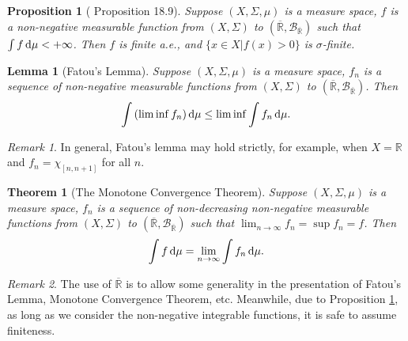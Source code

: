 \documentclass[openany]{book}
\newtheorem{lemma}{Lemma}[chapter]
\newtheorem{proposition}{Proposition}[chapter]
\newtheorem{theorem}{Theorem}[chapter]
\theoremstyle{definition}
\theoremstyle{remark}
\newtheorem*{remark}{Remark}
\begin{document}
\begin{proposition}[\cite{RF88} Proposition 18.9]\label{prop:inftyZeroMeasure}
    Suppose $(X,\Sigma,\mu)$ is a measure space, $f$ is a non-negative measurable function from $(X,\Sigma)$ to $(\overline{\mathbb{R}},\mathcal{B}_{\overline{\mathbb{R}}})$ such that $\int f \dif\mu<+\infty$. Then $f$ is finite a.e., and $\{x\in X|f(x)>0\}$ is $\sigma$-finite.
\end{proposition}
\begin{lemma}[Fatou's Lemma]
    Suppose $(X,\Sigma,\mu)$ is a measure space, $f_n$ is a sequence of non-negative measurable functions from $(X,\Sigma)$ to $(\overline{\mathbb{R}},\mathcal{B}_{\overline{\mathbb{R}}})$. Then
    \begin{equation*}
        \int\left(\lim\inf f_n\right)\dif\mu\le\lim\inf\int f_n \dif\mu.
    \end{equation*}
\end{lemma}
\begin{remark}
    In general, Fatou's lemma may hold strictly, for example, when $X=\mathbb{R}$ and $f_n=\chi_{[n,n+1]}$ for all $n$.
\end{remark}
\begin{theorem}[The Monotone Convergence Theorem]
    Suppose $(X,\Sigma,\mu)$ is a measure space, $f_n$ is a sequence of non-decreasing non-negative measurable functions from $(X,\Sigma)$ to $(\overline{\mathbb{R}},\mathcal{B}_{\overline{\mathbb{R}}})$ such that $\lim_{n\to\infty}f_n=\sup f_n=f$. Then
    \begin{equation*}
        \int f \dif\mu=\lim_{n\to\infty}\int f_n \dif\mu.
    \end{equation*}
\end{theorem}
\begin{remark}
    The use of $\overline{\mathbb{R}}$ is to allow some generality in the presentation of Fatou's Lemma, Monotone Convergence Theorem, etc. Meanwhile, due to Proposition \ref{prop:inftyZeroMeasure}, as long as we consider the non-negative integrable functions, it is safe to assume finiteness.
\end{remark}
\end{document}
